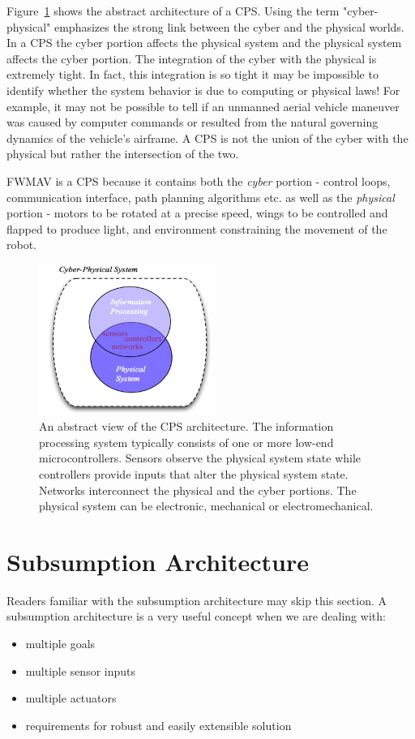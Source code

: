 Figure~\ref{fig_cps} shows the abstract architecture of a CPS. Using the term "cyber-physical" emphasizes the strong link between the cyber and the physical worlds. In a CPS the cyber portion affects the physical system and the physical system affects the cyber portion. The integration of the cyber with the physical is extremely tight. In fact, this integration is so tight it may be impossible to identify whether the system behavior is due to computing or physical laws! For example, it may not be possible to tell if an unmanned aerial vehicle maneuver was caused by computer commands or resulted from the natural governing dynamics of the vehicle’s airframe. A CPS is not the union of the cyber with the physical but rather the intersection of the two.

FWMAV is a CPS because it contains both the \textit{cyber} portion - control loops, communication interface, path planning algorithms etc. as well as the \textit{physical} portion - motors to be rotated at a precise speed, wings to be controlled and flapped to produce light, and environment constraining the movement of the robot. 

\begin{figure}
\centering
\includegraphics[width=0.5\textwidth]{Files/Figures/cps.png}
\caption[Cyber-Physical System]{An abstract view of the CPS architecture. The information processing system typically consists of one or more low-end microcontrollers. Sensors observe the physical system state while controllers provide inputs that alter the physical system state. Networks interconnect the physical and the cyber portions. The physical system can be electronic, mechanical or electromechanical.}
\label{fig_cps}
\end{figure}



\section{Subsumption Architecture}
\label{sec:subsumption_arch}
Readers familiar with the subsumption architecture may skip this section. A subsumption architecture\cite{brooks} is a very useful concept when we are dealing with:
\begin{itemize}
\item multiple goals
\item multiple sensor inputs
\item multiple actuators
\item requirements for robust and easily extensible solution
\end{itemize}

